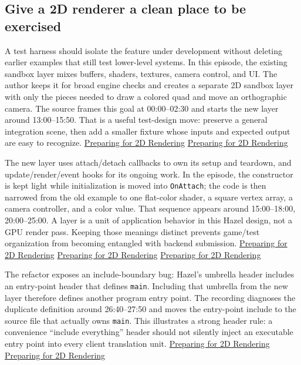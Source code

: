 \subsection{Give a 2D renderer a clean place to be exercised}\label{06-engine-ii-ch025-give-a-2d-renderer-a-clean-place-to-be-exercised}

A test harness should isolate the feature under development without deleting earlier examples that still test lower-level systems. In this episode, the existing sandbox layer mixes buffers, shaders, textures, camera control, and UI. The author keeps it for broad engine checks and creates a separate 2D sandbox layer with only the pieces needed to draw a colored quad and move an orthographic camera. The source frames this goal at 00:00--02:30 and starts the new layer around 13:00--15:50. That is a useful test-design move: preserve a general integration scene, then add a smaller fixture whose inputs and expected output are easy to recognize. \href{https://www.youtube.com/watch?v=sEiZZ2APlDs&t=0s}{Preparing for 2D Rendering} \href{https://www.youtube.com/watch?v=sEiZZ2APlDs&t=780s}{Preparing for 2D Rendering}

The new layer uses attach/detach callbacks to own its setup and teardown, and update/render/event hooks for its ongoing work. In the episode, the constructor is kept light while initialization is moved into \texttt{OnAttach}; the code is then narrowed from the old example to one flat-color shader, a square vertex array, a camera controller, and a color value. That sequence appears around 15:00--18:00, 20:00--25:00. A layer is a unit of application behavior in this Hazel design, not a GPU render pass. Keeping those meanings distinct prevents game/test organization from becoming entangled with backend submission. \href{https://www.youtube.com/watch?v=sEiZZ2APlDs&t=900s}{Preparing for 2D Rendering} \href{https://www.youtube.com/watch?v=sEiZZ2APlDs&t=1200s}{Preparing for 2D Rendering} \href{https://www.youtube.com/watch?v=sEiZZ2APlDs&t=1380s}{Preparing for 2D Rendering}

The refactor exposes an include-boundary bug: Hazel's umbrella header includes an entry-point header that defines \texttt{main}. Including that umbrella from the new layer therefore defines another program entry point. The recording diagnoses the duplicate definition around 26:40--27:50 and moves the entry-point include to the source file that actually owns \texttt{main}. This illustrates a strong header rule: a convenience ``include everything'' header should not silently inject an executable entry point into every client translation unit. \href{https://www.youtube.com/watch?v=sEiZZ2APlDs&t=1600s}{Preparing for 2D Rendering} \href{https://www.youtube.com/watch?v=sEiZZ2APlDs&t=1670s}{Preparing for 2D Rendering}

